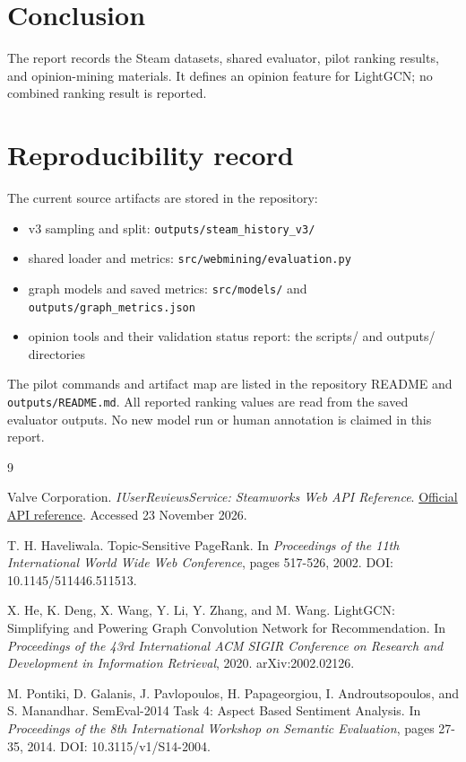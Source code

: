 \documentclass[11pt]{article}
\begin{document}
\section{Conclusion}

The report records the Steam datasets, shared evaluator, pilot ranking results, and opinion-mining materials. It defines an opinion feature for LightGCN; no combined ranking result is reported.

\section*{Reproducibility record}

The current source artifacts are stored in the repository:
\begin{itemize}
  \item v3 sampling and split: \texttt{outputs/steam\_history\_v3/}
  \item shared loader and metrics: \texttt{src/webmining/evaluation.py}
  \item graph models and saved metrics: \texttt{src/models/} and \texttt{outputs/graph\_metrics.json}
  \item opinion tools and their validation status report: the scripts/ and outputs/ directories
\end{itemize}
The pilot commands and artifact map are listed in the repository README and \texttt{outputs/README.md}. All reported ranking values are read from the saved evaluator outputs. No new model run or human annotation is claimed in this report.

\begingroup
\small
\setlength{\parskip}{0pt}
\setlength{\itemsep}{0pt}
\begin{thebibliography}{9}

Valve Corporation.
\newblock \emph{IUserReviewsService: Steamworks Web API Reference}.
\newblock \href{https://partner.steamgames.com/doc/webapi/IUserReviewsService}{Official API reference}. Accessed 23 November 2026.

T. H. Haveliwala.
\newblock Topic-Sensitive PageRank.
\newblock In \emph{Proceedings of the 11th International World Wide Web Conference}, pages 517-526, 2002.
\newblock DOI: 10.1145/511446.511513.

X. He, K. Deng, X. Wang, Y. Li, Y. Zhang, and M. Wang.
\newblock LightGCN: Simplifying and Powering Graph Convolution Network for Recommendation.
\newblock In \emph{Proceedings of the 43rd International ACM SIGIR Conference on Research and Development in Information Retrieval}, 2020.
\newblock arXiv:2002.02126.

M. Pontiki, D. Galanis, J. Pavlopoulos, H. Papageorgiou, I. Androutsopoulos, and S. Manandhar.
\newblock SemEval-2014 Task 4: Aspect Based Sentiment Analysis.
\newblock In \emph{Proceedings of the 8th International Workshop on Semantic Evaluation}, pages 27-35, 2014.
\newblock DOI: 10.3115/v1/S14-2004.

\end{thebibliography}
\endgroup
\end{document}
